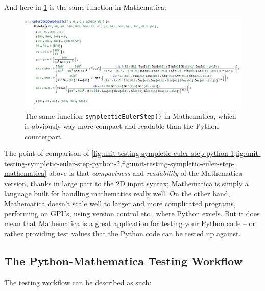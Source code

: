 And here in \cref{fig:unit-testing-sympletic-euler-step-mathematica} is the same function in Mathematica:

\begin{figure}[H]
    \centering
    \includegraphics[width=1.0\linewidth]{fig/unit-testing-sympletic-euler-step-mathematica.pdf}
    \caption{The same function \texttt{symplecticEulerStep()} in Mathematica, which is obviously way more compact and readable than the Python counterpart.}
    \label{fig:unit-testing-sympletic-euler-step-mathematica}
\end{figure}

The point of comparison of \cref{fig:unit-testing-sympletic-euler-step-python-1,fig:unit-testing-sympletic-euler-step-python-2,fig:unit-testing-sympletic-euler-step-mathematica} above is that \emph{compactness} and \emph{readability} of the Mathematica version, thanks in large part to the 2D input syntax; Mathematica is simply a language built for handling mathematics really well. On the other hand, Mathematica doesn't scale well to larger and more complicated programs, performing on GPUs, using version control etc., where Python excels. But it does mean that Mathematica is a great application for testing your Python code – or rather providing test values that the Python code can be tested up against.

\subsection{The Python-Mathematica Testing Workflow}

The testing workflow can be described as such:

